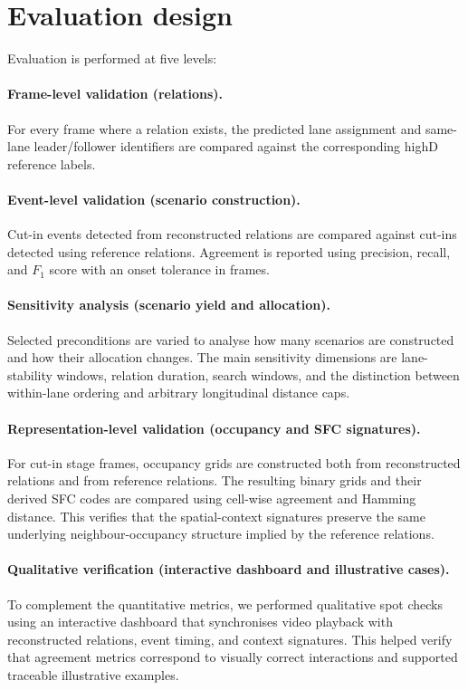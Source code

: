 \documentclass[12pt,a4paper,twoside,openright]{report}
\begin{document}
    \section{Evaluation design}
    Evaluation is performed at five levels:

    \paragraph{Frame-level validation (relations).}
    For every frame where a relation exists, the predicted lane assignment and same-lane leader/follower identifiers are compared against the corresponding highD reference labels.

    \paragraph{Event-level validation (scenario construction).}
    Cut-in events detected from reconstructed relations are compared against cut-ins detected using reference relations. Agreement is reported using precision, recall, and $F_1$ score with an onset tolerance in frames.

    \paragraph{Sensitivity analysis (scenario yield and allocation).}
    Selected preconditions are varied to analyse how many scenarios are constructed and how their allocation changes. The main sensitivity dimensions are lane-stability windows, relation duration, search windows, and the distinction between within-lane ordering and arbitrary longitudinal distance caps.

    \paragraph{Representation-level validation (occupancy and SFC signatures).}
    For cut-in stage frames, occupancy grids are constructed both from reconstructed relations and from reference relations. The resulting binary grids and their derived SFC codes are compared using cell-wise agreement and Hamming distance. This verifies that the spatial-context signatures preserve the same underlying neighbour-occupancy structure implied by the reference relations.

    \paragraph{Qualitative verification (interactive dashboard and illustrative cases).}
    To complement the quantitative metrics, we performed qualitative spot checks using an interactive dashboard that synchronises video playback with reconstructed relations, event timing, and context signatures. This helped verify that agreement metrics correspond to visually correct interactions and supported traceable illustrative examples.
\end{document}
